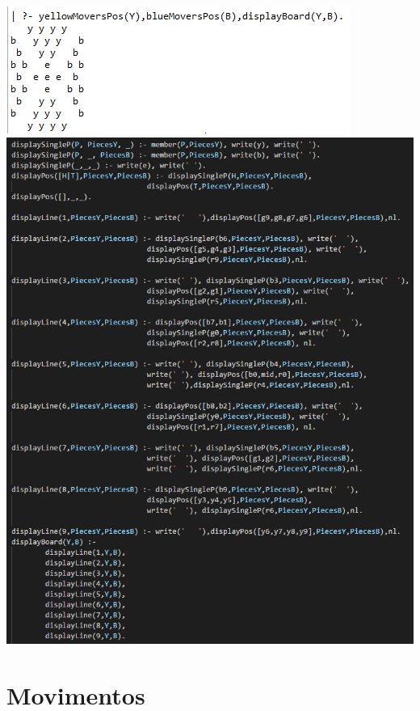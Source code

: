 \documentclass[a4paper]{article}
\begin{document}
\includegraphics[scale=1]{printBoard.PNG}\linebreak\linebreak
\includegraphics[scale=0.6]{displayBoard.PNG}\linebreak\linebreak




\section{Movimentos}
\end{document}
